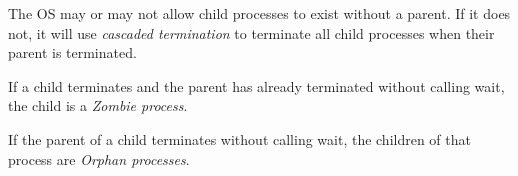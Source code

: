 The OS may or may not allow child processes to exist without a parent.
If it does not, it will use \textit{cascaded termination} to terminate all child processes
when their parent is terminated.

If a child terminates and the parent has already terminated without calling wait, the child
is a \textit{Zombie process}.

If the parent of a child terminates without calling wait, the children of that process
are \textit{Orphan processes}.